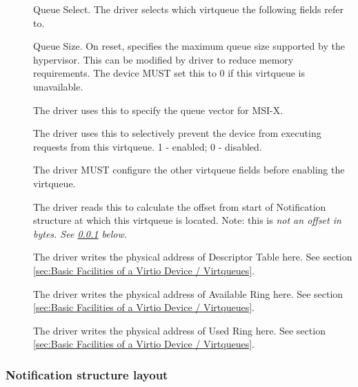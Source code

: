 \begin{description}
\item[]
        Queue Select. The driver selects which virtqueue the following
        fields refer to.

\item[]
        Queue Size.  On reset, specifies the maximum queue size supported by
        the hypervisor. This can be modified by driver to reduce memory requirements.
        The device MUST set this to 0 if this virtqueue is unavailable.

\item[]
        The driver uses this to specify the queue vector for MSI-X.

\item[]
        The driver uses this to selectively prevent the device from executing requests from this virtqueue.
        1 - enabled; 0 - disabled.

        The driver MUST configure the other virtqueue fields before enabling
        the virtqueue.

\item[]
        The driver reads this to calculate the offset from start of Notification structure at
        which this virtqueue is located.
        Note: this is \em{not} an offset in bytes.
        See \ref{sec:Virtio Transport Options / Virtio Over PCI Bus / PCI Device Layout / Notification capability} below.

\item[]
        The driver writes the physical address of Descriptor Table here.  See section \ref{sec:Basic Facilities of a Virtio Device / Virtqueues}.

\item[]
        The driver writes the physical address of Available Ring here.  See section \ref{sec:Basic Facilities of a Virtio Device / Virtqueues}.

\item[]
        The driver writes the physical address of Used Ring here.  See section \ref{sec:Basic Facilities of a Virtio Device / Virtqueues}.
\end{description}

\subsubsection{Notification structure layout}\label{sec:Virtio Transport Options / Virtio Over PCI Bus / PCI Device Layout / Notification capability}

